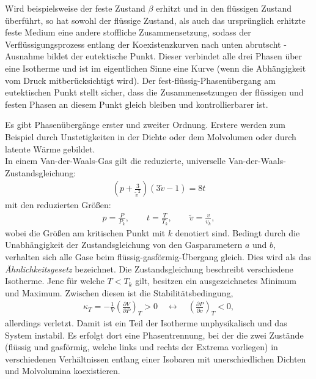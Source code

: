 Wird beispielsweise der feste Zustand $\beta$ erhitzt und in den flüssigen Zustand überführt, so hat sowohl der flüssige Zustand, als auch das ursprünglich erhitzte feste Medium eine andere stoffliche Zusammensetzung, sodass der Verflüssigungsprozess entlang der Koexistenzkurven nach unten abrutscht - Ausnahme bildet der eutektische Punkt. Dieser verbindet alle drei Phasen über eine Isotherme und ist im eigentlichen Sinne eine Kurve (wenn die Abhängigkeit vom Druck mitberücksichtigt wird). Der fest-flüssig-Phasenübergang am eutektischen Punkt stellt sicher, dass die Zusammensetzungen der flüssigen und festen Phasen an diesem Punkt gleich bleiben und kontrollierbarer ist.


\begin{summary}
    Es gibt Phasenübergänge erster und zweiter Ordnung. Erstere werden zum Beispiel durch Unstetigkeiten in der Dichte oder dem Molvolumen oder durch latente Wärme gebildet.\\
    In einem Van-der-Waals-Gas gilt die reduzierte, universelle Van-der-Waals-Zustandsgleichung:
    \begin{align*}
        \left(p+\frac{3}{\tilde{v}^2}\right)\left(3\tilde{v}-1\right)=8t
    \end{align*}
    mit den reduzierten Größen:
    \begin{align*}
        p=\frac{P}{P_k}, \qquad t=\frac{T}{T_k}, \qquad \tilde{v}=\frac{v}{v_k},
    \end{align*}
    wobei die Größen am kritischen Punkt mit $k$ denotiert sind.
    Bedingt durch die Unabhängigkeit der Zustandsgleichung von den Gasparametern $a$ und $b$, verhalten sich alle Gase beim flüssig-gasförmig-Übergang gleich. Dies wird als das \emph{Ähnlichkeitsgesetz} bezeichnet.
    Die Zustandsgleichung beschreibt verschiedene Isotherme. Jene für welche $T<T_k$ gilt, besitzen ein ausgezeichnetes Minimum und Maximum. Zwischen diesen ist die Stabilitätsbedingung,
    \begin{align*}
        \kappa_T=-\frac{1}{V}\left(\frac{\partial V}{\partial P}\right)_T>0 \quad \leftrightarrow \quad \left(\frac{\partial P}{\partial v}\right)_T<0,
    \end{align*}
    allerdings verletzt. Damit ist ein Teil der Isotherme unphysikalisch und das System instabil. Es erfolgt dort eine Phasentrennung, bei der die zwei Zustände (flüssig und gasförmig, welche links und rechts der Extrema vorliegen) in verschiedenen Verhältnissen entlang einer Isobaren mit unerschiedlichen Dichten und Molvolumina koexistieren.
    

\end{summary}
